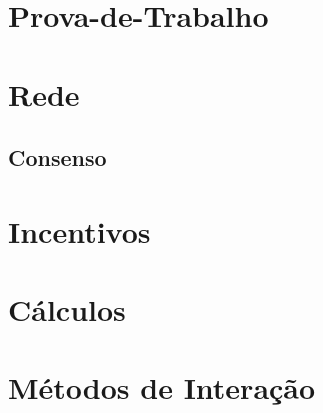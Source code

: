 \documentclass[conference]{IEEEtran}
\begin{document}

\section{Prova-de-Trabalho}

\section{Rede}

\subsection{Consenso}

\section{Incentivos}




\section{Cálculos}

\section{Métodos de Interação}
\end{document}
